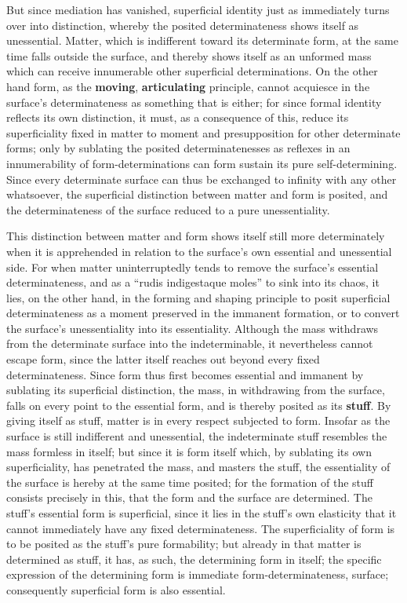 \documentclass[12pt,a4paper,openany]{book}
\newcommand{\opage}[1]{\marginnote{\footnotesize\textit{[#1]}}}
\begin{document}
But since mediation has vanished, superficial
identity just as immediately turns over into distinction,
whereby the posited determinateness shows itself as unessential.
Matter, which is indifferent toward its determinate form,
at the same time falls outside the surface, and thereby shows itself
as an unformed mass which can receive innumerable other
superficial determinations. On the other hand
form, as the \textbf{moving}, \textbf{articulating}
principle, cannot acquiesce in the surface's determinateness as something that is either; for since formal identity reflects its
own distinction, it must, as a consequence of this, reduce its
superficiality fixed in matter to moment and presupposition
for other determinate forms; only by sublating
the posited determinatenesses as reflexes in an innumerability
of form-determinations can form sustain its pure
\setcounter{footnote}{0}%
\opage{149}self-determining. Since every determinate surface can thus
be exchanged to infinity with any
other whatsoever, the superficial distinction between matter and
form is posited, and the determinateness of the surface reduced to
a pure unessentiality.

This distinction between matter and form shows itself
still more determinately when it is apprehended in relation to the surface's
own essential and unessential side. For when
matter uninterruptedly tends to remove the surface's
essential determinateness, and as a ``rudis indigestaque moles'' to sink into its chaos, it lies, on the other hand,
in the forming and shaping principle to posit
superficial determinateness as a moment preserved in the immanent formation,
or to convert the surface's
unessentiality into its essentiality. Although the mass
withdraws from the determinate surface into the indeterminable,
it nevertheless cannot escape form, since
the latter itself reaches out beyond every fixed determinateness.
Since form thus first becomes essential and immanent by sublating its superficial distinction,
the mass, in withdrawing from the surface, falls on
every point to the essential form, and is thereby
posited as its \textbf{stuff}. By giving itself as stuff,
matter is in every respect subjected to form. Insofar
as the surface is still indifferent and unessential,
the indeterminate stuff resembles the mass formless in itself;
but since it is form itself which, by sublating its
own superficiality, has penetrated the mass, and masters
the stuff, the essentiality of the surface is hereby
at the same time posited; for the formation of the stuff consists precisely
in this, that the form and the surface are determined. The stuff's
essential form is superficial, since it lies in
the stuff's own elasticity that it cannot immediately
have any fixed determinateness. The
\setcounter{footnote}{0}%
\opage{150}superficiality of form is to be posited as the stuff's pure formability; but
already in that matter is determined as stuff, it has,
as such, the determining form in itself; the specific
expression of the determining form is immediate
form-determinateness, surface; consequently superficial
form is also essential.
\end{document}
